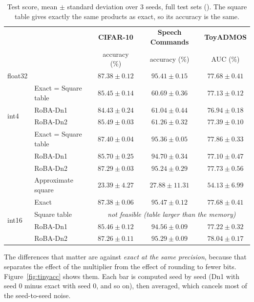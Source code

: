 \begin{table}[H]
\centering
\small
\begin{tabular}{llccc}
\toprule
 & & \textbf{CIFAR-10} & \textbf{Speech Commands} & \textbf{ToyADMOS}\\
 & & accuracy (\%) & accuracy (\%) & AUC (\%)\\
\midrule
float32 & & $87.38 \pm 0.12$ & $95.41 \pm 0.15$ & $77.68 \pm 0.41$\\
\midrule
\multirow{4}{*}{int4} & Exact = Square table & $85.45 \pm 0.14$ & $60.69 \pm 0.36$ & $77.13 \pm 0.12$\\
 & RoBA-Dn1 & $84.43 \pm 0.24$ & $61.04 \pm 0.44$ & $76.94 \pm 0.18$\\
 & RoBA-Dn2 & $85.49 \pm 0.03$ & $61.26 \pm 0.32$ & $77.39 \pm 0.10$\\
\midrule
\multirow{4}{*}{int8} & Exact = Square table & $87.40 \pm 0.04$ & $95.36 \pm 0.05$ & $77.86 \pm 0.33$\\
 & RoBA-Dn1 & $85.70 \pm 0.25$ & $94.70 \pm 0.34$ & $77.10 \pm 0.47$\\
 & RoBA-Dn2 & $87.29 \pm 0.03$ & $95.24 \pm 0.29$ & $77.73 \pm 0.56$\\
 & Approximate square & $23.39 \pm 4.27$ & $27.88 \pm 11.31$ & $54.13 \pm 6.99$\\
\midrule
\multirow{4}{*}{int16} & Exact & $87.38 \pm 0.06$ & $95.47 \pm 0.12$ & $77.68 \pm 0.41$\\
 & Square table & \multicolumn{3}{c}{\emph{not feasible (table larger than the memory)}}\\
 & RoBA-Dn1 & $85.46 \pm 0.12$ & $94.56 \pm 0.09$ & $77.22 \pm 0.32$\\
 & RoBA-Dn2 & $87.26 \pm 0.11$ & $95.29 \pm 0.09$ & $78.04 \pm 0.17$\\
\bottomrule
\end{tabular}
\caption{Test score, mean $\pm$ standard deviation over 3 seeds, full test sets
(). The square table gives exactly the same products as
exact, so its accuracy is the same.}
\label{tab:tinyacc}
\end{table}

The differences that matter are against \emph{exact at the same precision}, because that separates the
effect of the multiplier from the effect of rounding to fewer bits. Figure~\ref{fig:tinyacc} shows them. Each
bar is computed seed by seed (Dn1 with seed 0 minus exact with seed 0, and so on), then averaged, which cancels
most of the seed-to-seed noise.

